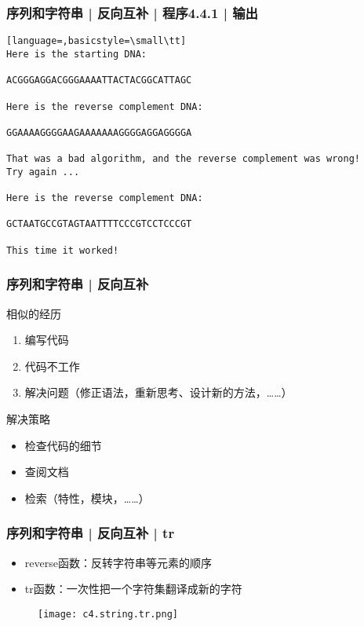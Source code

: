 \begin{frame}[fragile]
  \frametitle{序列和字符串 | 反向互补 | 程序4.4.1 | 输出}
\begin{lstlisting}[language=,basicstyle=\small\tt]
Here is the starting DNA:

ACGGGAGGACGGGAAAATTACTACGGCATTAGC

Here is the reverse complement DNA:

GGAAAAGGGGAAGAAAAAAAGGGGAGGAGGGGA

That was a bad algorithm, and the reverse complement was wrong!
Try again ...

Here is the reverse complement DNA:

GCTAATGCCGTAGTAATTTTCCCGTCCTCCCGT

This time it worked!
\end{lstlisting}
\end{frame}

\begin{frame}
  \frametitle{序列和字符串 | 反向互补}
   \begin{block}{相似的经历}
     \begin{enumerate}
       \item 编写代码
       \item 代码不工作
       \item 解决问题（修正语法，重新思考、设计新的方法，……）
     \end{enumerate}
   \end{block} 
   \pause
   \begin{block}{解决策略}
     \begin{itemize}
       \item 检查代码的细节
       \item 查阅文档
       \item 检索（特性，模块，……）
     \end{itemize}
   \end{block}
\end{frame}

\begin{frame}
  \frametitle{序列和字符串 | 反向互补 | \alert{tr}}
  \begin{itemize}
    \item reverse函数：反转字符串等元素的顺序
    \item tr函数：一次性把一个字符集翻译成新的字符
  \end{itemize}
  \begin{figure}
    \centering
    \texttt{[image: c4.string.tr.png]}
  \end{figure}
\end{frame}

